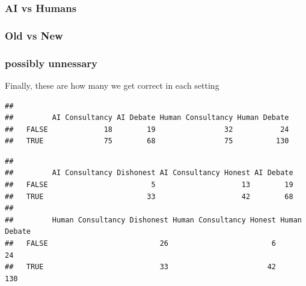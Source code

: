 \documentclass[
]{article}
\newenvironment{Shaded}{\begin{snugshade}}{\end{snugshade}}
\newcommand{\FunctionTok}[1]{\textcolor[rgb]{0.13,0.29,0.53}{\textbf{#1}}}
\newcommand{\NormalTok}[1]{#1}
\newcommand{\OtherTok}[1]{\textcolor[rgb]{0.56,0.35,0.01}{#1}}
\newcommand{\SpecialCharTok}[1]{\textcolor[rgb]{0.81,0.36,0.00}{\textbf{#1}}}
\begin{document}
\subsubsection{AI vs Humans}\label{ai-vs-humans}

\subsubsection{Old vs New}\label{old-vs-new}

\subsubsection{possibly unnessary}\label{possibly-unnessary}

Finally, these are how many we get correct in each setting

\begin{Shaded}
\end{Shaded}

\begin{verbatim}
##        
##         AI Consultancy AI Debate Human Consultancy Human Debate
##   FALSE             18        19                32           24
##   TRUE              75        68                75          130
\end{verbatim}

\begin{Shaded}
\end{Shaded}

\begin{verbatim}
##        
##         AI Consultancy Dishonest AI Consultancy Honest AI Debate
##   FALSE                        5                    13        19
##   TRUE                        33                    42        68
##        
##         Human Consultancy Dishonest Human Consultancy Honest Human Debate
##   FALSE                          26                        6           24
##   TRUE                           33                       42          130
\end{verbatim}
\end{document}
